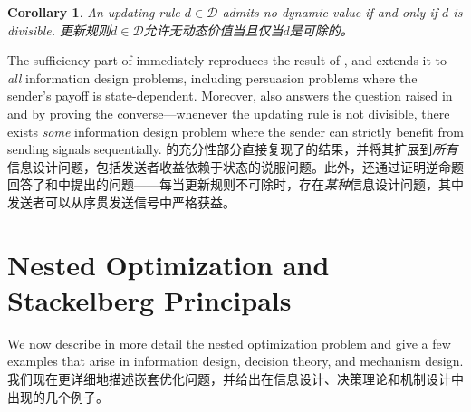 \documentclass[12pt,letterpaper]{article}
\newenvironment{original}{\color{black}}{}
\newenvironment{translation}{\color{blue}}{}
\theoremstyle{plain}
\newtheorem{cor}{Corollary}
\theoremstyle{definition}
\theoremstyle{remark}
\theoremstyle{definition}
\begin{document}
\begin{cor}\label{cor:dynamic}
\begin{original}
An updating rule $d \in \mathcal{D}$ admits no dynamic value if and only if $d$ is divisible.
\end{original}
\begin{translation}
更新规则$d \in \mathcal{D}$允许无动态价值当且仅当$d$是可除的。
\end{translation}
\end{cor}

\begin{original}
The sufficiency part of  immediately reproduces the result of \citet{kobayashi2025dynamic}, and extends it to \emph{all} information design problems, including persuasion problems where the sender's payoff is state-dependent. Moreover,  also answers the question raised in \citet{azrieli2025sequential} and \citet{kobayashi2025dynamic} by proving the converse---whenever the updating rule is not divisible, there exists \textit{some} information design problem where the sender can strictly benefit from sending signals sequentially.
\end{original}
\begin{translation}
的充分性部分直接复现了\citet{kobayashi2025dynamic}的结果，并将其扩展到\textit{所有}信息设计问题，包括发送者收益依赖于状态的说服问题。此外，还通过证明逆命题回答了\citet{azrieli2025sequential}和\citet{kobayashi2025dynamic}中提出的问题——每当更新规则不可除时，存在\textit{某种}信息设计问题，其中发送者可以从序贯发送信号中严格获益。
\end{translation}

\section{Nested Optimization and Stackelberg Principals}\label{sec:stackelberg}

\begin{original}
We now describe in more detail the nested optimization problem and give a few examples that arise in information design, decision theory, and mechanism design.
\end{original}
\begin{translation}
我们现在更详细地描述嵌套优化问题，并给出在信息设计、决策理论和机制设计中出现的几个例子。
\end{translation}
\end{document}

